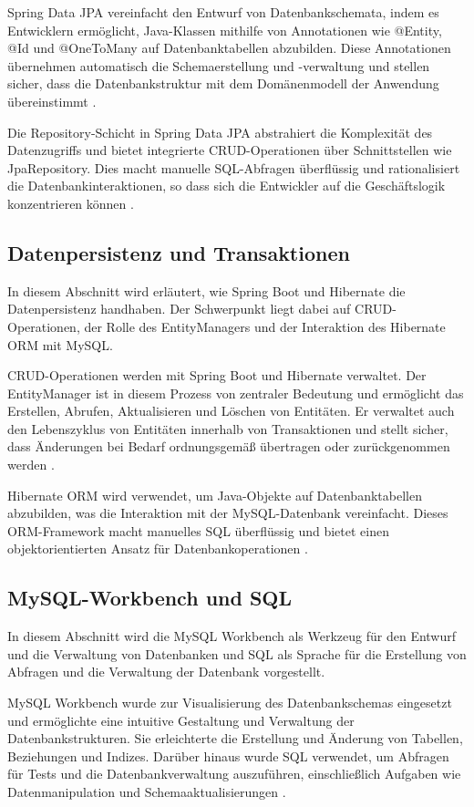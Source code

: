Spring Data JPA vereinfacht den Entwurf von Datenbankschemata, indem es Entwicklern ermöglicht, Java-Klassen mithilfe von Annotationen wie @Entity, @Id und @OneToMany auf Datenbanktabellen abzubilden. Diese Annotationen übernehmen automatisch die Schemaerstellung und -verwaltung und stellen sicher, dass die Datenbankstruktur mit dem Domänenmodell der Anwendung übereinstimmt \cite{Docs-Spring:o.J, Baeldung:o.J}.

Die Repository-Schicht in Spring Data JPA abstrahiert die Komplexität des Datenzugriffs und bietet integrierte CRUD-Operationen über Schnittstellen wie JpaRepository. Dies macht manuelle SQL-Abfragen überflüssig und rationalisiert die Datenbankinteraktionen, so dass sich die Entwickler auf die Geschäftslogik konzentrieren können \cite{Docs-Spring-JPA-Repo:o.J, Docs-Spring-JPA-QueryMethods:o.J}.

\subsection{Datenpersistenz und Transaktionen}
In diesem Abschnitt wird erläutert, wie Spring Boot und Hibernate die Datenpersistenz handhaben. Der Schwerpunkt liegt dabei auf CRUD-Operationen, der Rolle des EntityManagers und der Interaktion des Hibernate ORM mit MySQL.

CRUD-Operationen werden mit Spring Boot und Hibernate verwaltet. Der EntityManager ist in diesem Prozess von zentraler Bedeutung und ermöglicht das Erstellen, Abrufen, Aktualisieren und Löschen von Entitäten. Er verwaltet auch den Lebenszyklus von Entitäten innerhalb von Transaktionen und stellt sicher, dass Änderungen bei Bedarf ordnungsgemäß übertragen oder zurückgenommen werden  \cite{Baeldung-EntityManager:2024}.


Hibernate ORM wird verwendet, um Java-Objekte auf Datenbanktabellen abzubilden, was die Interaktion mit der MySQL-Datenbank vereinfacht. Dieses ORM-Framework macht manuelles SQL überflüssig und bietet einen objektorientierten Ansatz für Datenbankoperationen \cite{Hibernate:o.J}.


\subsection{MySQL-Workbench und SQL}
In diesem Abschnitt wird die MySQL Workbench als Werkzeug für den Entwurf und die Verwaltung von Datenbanken und SQL als Sprache für die Erstellung von Abfragen und die Verwaltung der Datenbank vorgestellt.

MySQL Workbench wurde zur Visualisierung des Datenbankschemas eingesetzt und ermöglichte eine intuitive Gestaltung und Verwaltung der Datenbankstrukturen. Sie erleichterte die Erstellung und Änderung von Tabellen, Beziehungen und Indizes. Darüber hinaus wurde SQL verwendet, um Abfragen für Tests und die Datenbankverwaltung auszuführen, einschließlich Aufgaben wie Datenmanipulation und Schemaaktualisierungen \cite{mySQL:o.J}.

